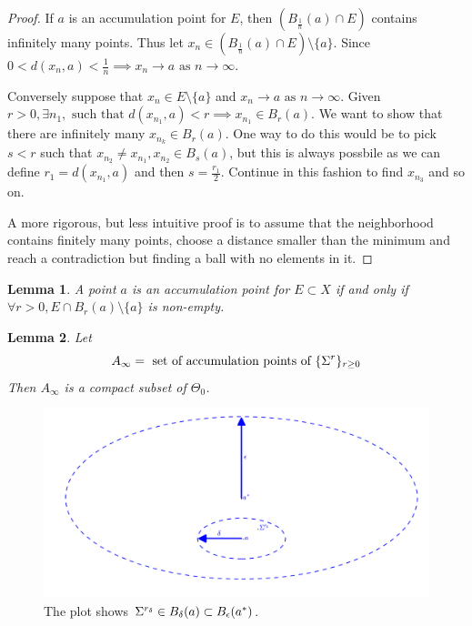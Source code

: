 \documentclass[12pt, leqno]{article}
\def\s{\ensuremath\Sigma}
\newtheorem{lemma}{Lemma}[]
\begin{document}
\begin{proof}
If $a$ is an accumulation point for $E$, then $(B_{\frac{1}{n}}(a)
\cap E)$ contains infinitely many points. Thus let $x_n \in
(B_{\frac{1}{n}}(a) \cap E) \setminus \{a\}$. Since $0 <
d(x_n,a)<\frac{1}{n} \implies x_n \to a \text{ as } n \to \infty$.

Conversely suppose that $x_n \in E \setminus \{a\}$ and $x_n \to a
\text{ as } n \to \infty$. Given $r>0, \exists n_1, \text{ such that }
d(x_{n_1},a) < r \implies x_{n_1} \in B_r(a)$. We want to show that
there are infinitely many $x_{n_k} \in B_r(a)$. One way to do this
would be to pick $s<r$ such that $x_{n_2} \not= x_{n_1}, x_{n_2} \in
B_s(a)$, but this is always possbile as we can define $r_1 =
d(x_{n_1},a)$ and then $s = \frac{r_1 }{2}$. Continue in this fashion
to find $x_{n_3}$ and so on. 

A more rigorous, but less intuitive proof is to assume that the neighborhood
contains finitely many points, choose a distance smaller than the minimum and reach a contradiction but finding a
ball with no elements in it. 
\end{proof}
\begin{lemma}
A point $a$ is an accumulation point for $E \subset X$ if and only if
$\forall r>0, E \cap B_{r}(a)\setminus \{a\}$ is non-empty.
\end{lemma}
\begin{lemma} 
Let 
\[
A_{\infty} = \text{ set of accumulation points of } \{\s^r\}_{r \geq 0}
\]
Then $A_{\infty}$ is a compact subset of $\Theta_0$.
\end{lemma}
\begin{figure}
\begin{center}
  \includegraphics [scale=0.4]{circles.pdf}
\end{center}
  \caption{The plot shows $\s^{r_{\delta}} \in B_{\delta}(a) \subset B_{\epsilon}(a^*) $.}
\label{circles}
\end{figure}
\end{document}
